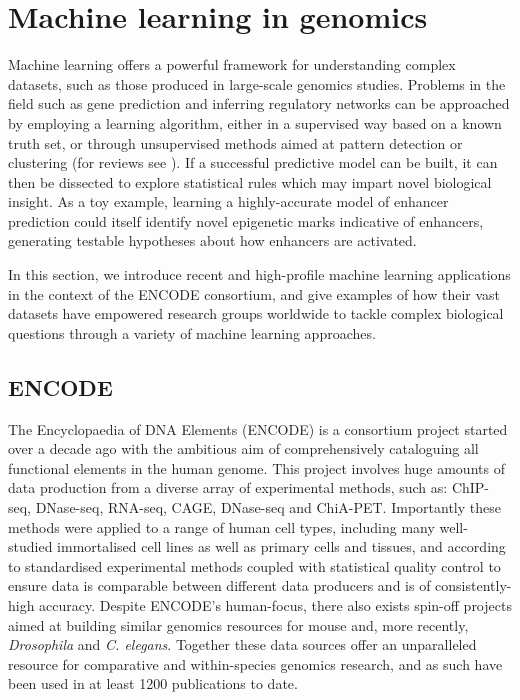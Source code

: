 \documentclass[a4paper,11pt,oneside]{book}
\begin{document}


\section{Machine learning in genomics}\label{intro:ml}

Machine learning offers a powerful framework for understanding complex datasets, such as those produced in large-scale genomics studies. Problems in the field such as gene prediction and inferring regulatory networks can be approached by employing a learning algorithm, either in a supervised way based on a known truth set, or through unsupervised methods aimed at pattern detection or clustering (for reviews see ). If a successful predictive model can be built, it can then be dissected to explore statistical rules which may impart novel biological insight. As a toy example, learning a highly-accurate model of enhancer prediction could itself identify novel epigenetic marks indicative of enhancers, generating testable hypotheses about how enhancers are activated.

In this section, we introduce recent and high-profile machine learning applications in the context of the ENCODE consortium, and give examples of how their vast datasets have empowered research groups worldwide to tackle complex biological questions through a variety of machine learning approaches. 

\subsection{ENCODE}\label{intro:encode}

The Encyclopaedia of DNA Elements (ENCODE) is a consortium project started over a decade ago with the ambitious aim of comprehensively cataloguing all functional elements in the human genome.\cite{Feingold2004, Qu2013, Dunham2012} This project involves huge amounts of data production from a diverse array of experimental methods, such as: ChIP-seq, DNase-seq, RNA-seq, CAGE, DNase-seq and ChiA-PET.\cite{Myers2011} Importantly these methods were applied to a range of human cell types, including many well-studied immortalised cell lines as well as primary cells and tissues, and according to standardised experimental methods\cite{Landt2012} coupled with statistical quality control\cite{Dunham2012, Boyle2014, Marinov2013} to ensure data is comparable between different data producers and is of consistently-high accuracy. Despite ENCODE's human-focus, there also exists spin-off projects aimed at building similar genomics resources for mouse\cite{Yue2014} and, more recently, \emph{Drosophila} and \emph{C. elegans}.\cite{Ho2014} Together these data sources offer an unparalleled resource for comparative and within-species genomics research, and as such have been used in at least 1200 publications to date.\cite{encodenews}
\end{document}
